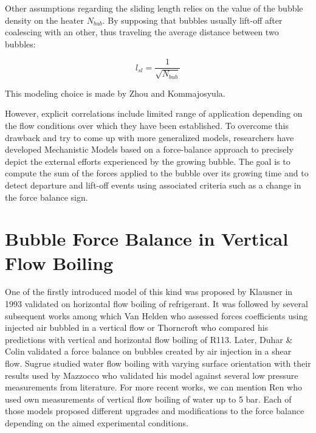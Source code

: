 Other assumptions regarding the sliding length relies on the value of the bubble density on the heater $N_{bub}$. By supposing that bubbles usually lift-off after coalescing with an other, thus traveling the average distance between two bubbles:

\begin{equation}
l_{sl} = \frac{1}{\sqrt{N_{bub}}}
\end{equation}

\begin{remark*}{}
This modeling choice is made by Zhou \etal and Kommajosyula.
\end{remark*}

\npar

However, explicit correlations include limited range of application depending on the flow conditions over which they have been established. To overcome this drawback and try to come up with more generalized models, researchers have developed Mechanistic Models based on a force-balance approach to precisely depict the external efforts experienced by the growing bubble. The goal is to compute the sum of the forces applied to the bubble over its growing time and to detect departure and lift-off events using associated criteria such as a change in the force balance sign.




\section{Bubble Force Balance in Vertical Flow Boiling}

One of the firstly introduced model of this kind was proposed by Klausner \etal in 1993 \cite{klausner_vapor_1993} validated on horizontal flow boiling of refrigerant. It was followed by several subsequent works among which Van Helden \etal \cite{van_helden_forces_1995} who assessed forces coefficients using injected air bubbled in a vertical flow or Thorncroft \cite{thorncroft_bubble_2001} who compared his predictions with vertical and horizontal flow boiling of R113. Later, Duhar \& Colin \cite{duhar_dynamics_2006} validated a force balance on bubbles created by air injection in a shear flow. Sugrue \etal \cite{sugrue_experimental_2014} studied water flow boiling with varying surface orientation with their results used by Mazzocco \etal \cite{mazzocco_reassessed_2018} who validated his model against several low pressure measurements from literature. For more recent works, we can mention Ren \etal \cite{ren_development_2020} who used own measurements of vertical flow boiling of water up to 5 bar. Each of those models proposed different upgrades and modifications to the force balance depending on the aimed experimental conditions.

